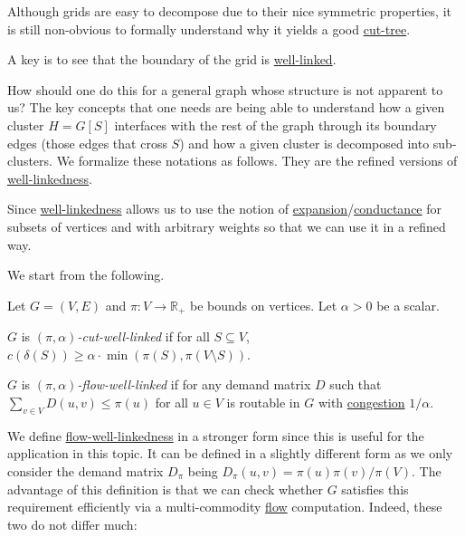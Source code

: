 Although grids are easy to decompose due to their nice symmetric properties, it is still non-obvious to formally understand why it yields a good \hyperref[def:cut-tree]{cut-tree}.

\begin{intuition}
	A key is to see that the boundary of the grid is \hyperref[def:well-linked]{well-linked}.
\end{intuition}

How should one do this for a general graph whose structure is not apparent to us? The key concepts that one needs are being able to understand how a given cluster \(H = G[S]\) interfaces with the rest of the graph through its boundary edges (those edges that cross \(S\)) and how a given cluster is decomposed into sub-clusters. We formalize these notations as follows. They are the refined versions of \hyperref[def:well-linked]{well-linkedness}.

\begin{intuition}
	Since \hyperref[def:well-linked]{well-linkedness} allows us to use the notion of \hyperref[def:expansion]{expansion}/\hyperref[def:conductance]{conductance} for subsets of vertices and with arbitrary weights so that we can use it in a refined way.
\end{intuition}

We start from the following.

\begin{definition}\label{def:cut-flow-well-linked}
	Let \(G = (V, E)\) and \(\pi \colon V \to \mathbb{R} _{+}\) be bounds on vertices. Let \(\alpha > 0\) be a scalar.
	\begin{definition}\label{def:cut-well-linked}
		\(G\) is \emph{\((\pi , \alpha) \)-cut-well-linked} if for all \(S \subseteq V\), \(c(\delta (S)) \geq \alpha \cdot \min (\pi (S), \pi (V \setminus S))\).
	\end{definition}

	\begin{definition}\label{def:flow-well-linked}
		\(G\) is \emph{\((\pi , \alpha )\)-flow-well-linked} if for any demand matrix \(D\) such that \(\sum_{v \in V} D(u, v) \leq \pi (u)\) for all \(u \in V\) is routable in \(G\) with \hyperref[def:congestion]{congestion} \(1 / \alpha \).
	\end{definition}
\end{definition}

We define \hyperref[def:flow-well-linked]{flow-well-linkedness} in a stronger form since this is useful for the application in this topic. It can be defined in a slightly different form as we only consider the demand matrix \(D_\pi \) being \(D_\pi (u, v) = \pi (u) \pi (v) / \pi (V)\). The advantage of this definition is that we can check whether \(G\) satisfies this requirement efficiently via a multi-commodity \hyperref[def:flow]{flow} computation. Indeed, these two do not differ much:

